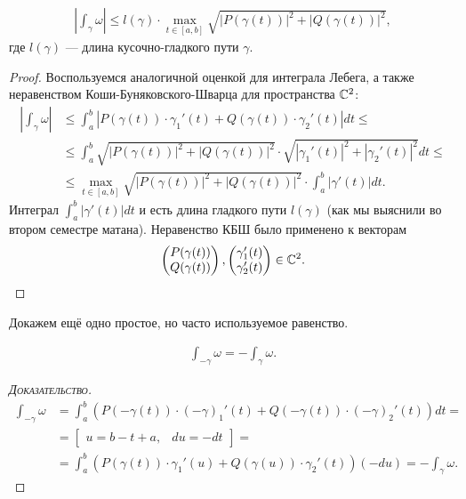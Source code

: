 \documentclass[../complex-analysis.tex]{subfiles}
\begin{document}
\begin{lm}
 \begin{align}
  \label{eq:bound_on_absolute_value_of_int}
  \left| \int_{\gamma} \omega  \right| \leqslant l(\gamma) \cdot \max_{t \in [a,b]} \sqrt{\left| P(\gamma(t)) \right|^{2} + \left| Q(\gamma(t)) \right|^{2}},
 \end{align} где $l(\gamma)$ --- длина кусочно-гладкого пути $\gamma$.
\end{lm}
\begin{proof}
 Воспользуемся аналогичной оценкой для интеграла Лебега, а также неравенством Коши-Буняковского-Шварца для пространства $\mathbb{C}^{2}$:
 \begin{align*}
  \left| \int_{\gamma} \omega  \right| &\leqslant \int_{a}^{b} \left| P(\gamma(t))\cdot\gamma_1'(t) + Q(\gamma(t))\cdot\gamma_2'(t) \right|dt \leqslant \\
  &\leqslant \int_{a}^{b} \sqrt{\left| P(\gamma(t)) \right|^{2} + \left| Q(\gamma(t)) \right|^{2}} \cdot \sqrt{\left| \gamma_1'(t) \right|^{2} + \left| \gamma_2'(t) \right|^{2}} dt \leqslant \\
  &\leqslant \max_{t \in [a,b]} \sqrt{\left| P(\gamma(t)) \right|^{2} + \left| Q(\gamma(t)) \right|^{2}} \cdot \int_{a}^{b} \left| \gamma'(t) \right|  dt
 .\end{align*} Интеграл $\int_{a}^{b} \left| \gamma'(t) \right|dt$ и есть длина гладкого пути $l(\gamma)$ (как мы выяснили во втором семестре матана). Неравенство КБШ было применено к векторам
 \begin{align*}
  \begin{pmatrix}
   P(\gamma(t)) \\ Q(\gamma(t))
   \end{pmatrix}, \begin{pmatrix}
   \gamma_1'(t) \\ \gamma_2'(t)
  \end{pmatrix} \in \mathbb{C}^{2}.
 \end{align*}
\end{proof}

Докажем ещё одно простое, но часто используемое равенство.

\begin{prop}
 \begin{align*}
  \int_{-\gamma} \omega = -\int_{\gamma} \omega.  
 \end{align*}
\end{prop}
\begin{proof}[\normalfont\textsc{Доказательство}]
 \begin{align*}
  \int_{-\gamma} \omega &= \int_{a}^{b} \left( P(-\gamma(t)) \cdot (-\gamma)_1'(t)  + Q(-\gamma(t)) \cdot (-\gamma)_2'(t) \right) dt = \\
  &= \begin{bmatrix}
   u = b - t + a, & du = -dt
  \end{bmatrix} = \\
  &= \int_{a}^{b} \left( P(\gamma(t)) \cdot \gamma_1'(u) + Q(\gamma(u)) \cdot \gamma_2'(t) \right)(-du) = - \int_{\gamma} \omega. 
 \end{align*}
\end{proof}
\end{document}
